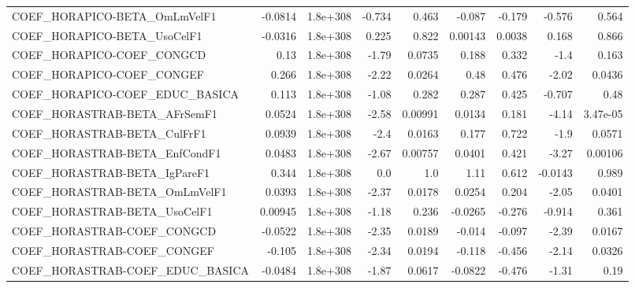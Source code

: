 \begin{tabular}{lrrrrrrrr}
COEF\_HORAPICO-BETA\_OmLmVelF1          &     -0.0814 &     1.8e+308 &   -0.734 &    0.463 &     -0.087 &      -0.179 &       -0.576 &         0.564 \\
COEF\_HORAPICO-BETA\_UsoCelF1           &     -0.0316 &     1.8e+308 &    0.225 &    0.822 &    0.00143 &      0.0038 &        0.168 &         0.866 \\
COEF\_HORAPICO-COEF\_CONGCD             &        0.13 &     1.8e+308 &    -1.79 &   0.0735 &      0.188 &       0.332 &         -1.4 &         0.163 \\
COEF\_HORAPICO-COEF\_CONGEF             &       0.266 &     1.8e+308 &    -2.22 &   0.0264 &       0.48 &       0.476 &        -2.02 &        0.0436 \\
COEF\_HORAPICO-COEF\_EDUC\_BASICA        &       0.113 &     1.8e+308 &    -1.08 &    0.282 &      0.287 &       0.425 &       -0.707 &          0.48 \\
COEF\_HORASTRAB-BETA\_AFrSemF1          &      0.0524 &     1.8e+308 &    -2.58 &  0.00991 &     0.0134 &       0.181 &        -4.14 &      3.47e-05 \\
COEF\_HORASTRAB-BETA\_CulFrF1           &      0.0939 &     1.8e+308 &     -2.4 &   0.0163 &      0.177 &       0.722 &         -1.9 &        0.0571 \\
COEF\_HORASTRAB-BETA\_EnfCondF1         &      0.0483 &     1.8e+308 &    -2.67 &  0.00757 &     0.0401 &       0.421 &        -3.27 &       0.00106 \\
COEF\_HORASTRAB-BETA\_IgPareF1          &       0.344 &     1.8e+308 &      0.0 &      1.0 &       1.11 &       0.612 &      -0.0143 &         0.989 \\
COEF\_HORASTRAB-BETA\_OmLmVelF1         &      0.0393 &     1.8e+308 &    -2.37 &   0.0178 &     0.0254 &       0.204 &        -2.05 &        0.0401 \\
COEF\_HORASTRAB-BETA\_UsoCelF1          &     0.00945 &     1.8e+308 &    -1.18 &    0.236 &    -0.0265 &      -0.276 &       -0.914 &         0.361 \\
COEF\_HORASTRAB-COEF\_CONGCD            &     -0.0522 &     1.8e+308 &    -2.35 &   0.0189 &     -0.014 &      -0.097 &        -2.39 &        0.0167 \\
COEF\_HORASTRAB-COEF\_CONGEF            &      -0.105 &     1.8e+308 &    -2.34 &   0.0194 &     -0.118 &      -0.456 &        -2.14 &        0.0326 \\
COEF\_HORASTRAB-COEF\_EDUC\_BASICA       &     -0.0484 &     1.8e+308 &    -1.87 &   0.0617 &    -0.0822 &      -0.476 &        -1.31 &          0.19 \\

\end{tabular}
